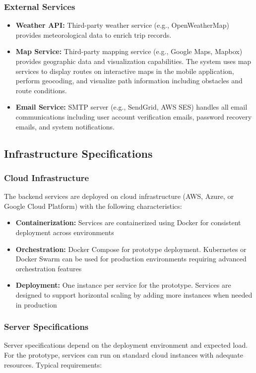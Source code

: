 \subsubsection{External Services}
\begin{itemize}
    \item \textbf{Weather API:} Third-party weather service (e.g., OpenWeatherMap) provides meteorological data to enrich trip records.
    
    \item \textbf{Map Service:} Third-party mapping service (e.g., Google Maps, Mapbox) provides geographic data and visualization capabilities. The system uses map services to display routes on interactive maps in the mobile application, perform geocoding, and visualize path information including obstacles and route conditions.
    
    \item \textbf{Email Service:} SMTP server (e.g., SendGrid, AWS SES) handles all email communications including user account verification emails, password recovery emails, and system notifications.
\end{itemize}

\subsection{Infrastructure Specifications}

\subsubsection{Cloud Infrastructure}
The backend services are deployed on cloud infrastructure (AWS, Azure, or Google Cloud Platform) with the following characteristics:

\begin{itemize}
    \item \textbf{Containerization:} Services are containerized using Docker for consistent deployment across environments
    \item \textbf{Orchestration:} Docker Compose for prototype deployment. Kubernetes or Docker Swarm can be used for production environments requiring advanced orchestration features
    \item \textbf{Deployment:} One instance per service for the prototype. Services are designed to support horizontal scaling by adding more instances when needed in production
\end{itemize}

\subsubsection{Server Specifications}
Server specifications depend on the deployment environment and expected load. For the prototype, services can run on standard cloud instances with adequate resources. Typical requirements:

